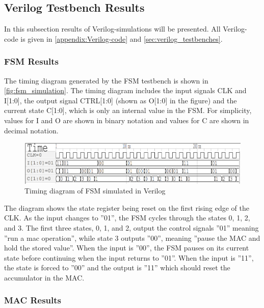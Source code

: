 \subsection{Verilog Testbench Results}

In this subsection results of Verilog-simulations will be presented. All Verilog-code is given in \autoref{appendix:Verilog-code} and \ref{sec:verilog_testbenches}.

\subsubsection{FSM Results}
\label{subsubsec:fsm_results}

\noindent
The timing diagram generated by the FSM testbench is shown in \autoref{fig:fsm_simulation}. The timing diagram includes the input signals CLK and I[1:0], the output signal CTRL[1:0] (shown as O[1:0] in the figure) and the current state C[1:0], which is only an internal value in the FSM. For simplicity, values for I and O are shown in binary notation and values for C are shown in decimal notation.

\begin{figure}[H]
    \centering
    \includegraphics[width=\textwidth]{Figures/FSM_testbench_out.png}
    \caption{Timing diagram of FSM simulated in Verilog}
    \label{fig:fsm_simulation}
\end{figure}

The diagram shows the state register being reset on the first rising edge of the CLK. As the input changes to ''01'', the FSM cycles through the states 0, 1, 2, and 3. The first three states, 0, 1, and 2, output the control signals ''01'' meaning ''run a mac operation'', while state 3 outputs ''00'', meaning ''pause the MAC and hold the stored value''. When the input is ''00'', the FSM pauses on its current state before continuing when the input returns to ''01''. When the input is ''11'', the state is forced to ''00'' and the output is ''11'' which should reset the accumulator in the MAC.

\subsubsection{MAC Results}
\label{subsubsec:mac_results}


